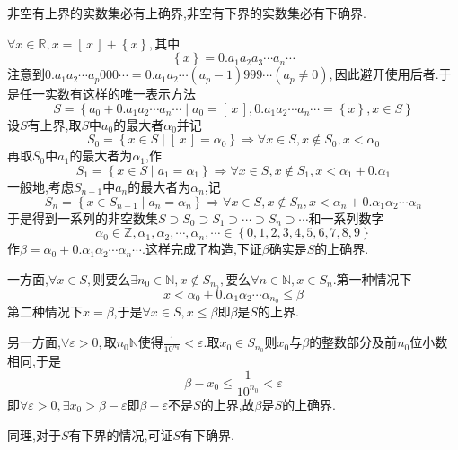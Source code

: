 \begin{formal}
    \begin{theorem}\label{thm:确界存在定理/实数系连续性定理}
        非空有上界的实数集必有上确界,非空有下界的实数集必有下确界.
    \end{theorem}
    \begin{Proof}
        $\forall x\in\mathbb{R},x=\left[\,x\,\right]+\left\{x\right\},$其中\[
        \left\{x\right\}=0.a_1a_2a_3\cdots a_n\cdots
        \]注意到$0.a_1a_2\cdots a_p000\cdots=0.a_1a_2\cdots \left(a_p-1\right)999\cdots\left(a_p\neq 0\right),$因此避开使用后者.于是任一实数有这样的唯一表示方法\[
        S=\left\{
            a_0+0.a_1a_2\cdots a_n\cdots\mid a_0=\left[\,x\,\right],0.a_1a_2\cdots a_n\cdots=\left\{x\right\},x\in S
        \right\}
        \]设$S$有上界,取$S$中$a_0$的最大者$\alpha_0$并记\[
        S_0=\left\{
            x\in S\mid \left[\,x\,\right]=\alpha_0
        \right\}\Longrightarrow\forall x\in S,x\notin S_0,x<\alpha_0
        \]再取$S_0$中$a_1$的最大者为$\alpha_1$,作\[
        S_1=\left\{
            x\in S\mid a_1=\alpha_1
        \right\}\Longrightarrow\forall x\in S,x\notin S_1,x<\alpha_1+0.\alpha_1
        \]一般地,考虑$S_{n-1}$中$a_n$的最大者为$\alpha_n$,记\[
        S_n=\left\{
            x\in S_{n-1}\mid a_n=\alpha_n
        \right\}\Longrightarrow\forall x\in S,x\notin S_n,x<\alpha_n+0.\alpha_1\alpha_2\cdots\alpha_n
        \]于是得到一系列的非空数集$
        S\supset S_0\supset S_1\supset\cdots\supset S_n\supset\cdots
        $和一系列数字\[
        \alpha_0\in\mathbb{Z},\alpha_1,\alpha_2,\cdots,\alpha_n,\cdots\in\left\{
            0,1,2,3,4,5,6,7,8,9
        \right\}
        \]作$\beta=\alpha_0+0.\alpha_1\alpha_2\cdots\alpha_n\cdots$.这样完成了构造,下证$\beta$确实是$S$的上确界.

        一方面,$\forall x\in S,$则要么$\exists n_0\in\mathbb{N},x\notin S_{n_0},$要么$\forall n\in\mathbb{N},x\in S_n.$第一种情况下\[
        x<\alpha_0+0.\alpha_1\alpha_2\cdots\alpha_{n_0}\leqslant \beta
        \]第二种情况下$x=\beta$,于是$\forall x\in S,x\leqslant \beta$即$\beta$是$S$的上界.

        另一方面,$\forall \varepsilon >0,$取$n_0\mathbb{N}$使得$\displaystyle \frac{
            1
        }{10^{n_0}}<\varepsilon.$取$x_0\in S_{n_0}$则$x_0$与$\beta$的整数部分及前$n_0$位小数相同,于是\[
        \beta-x_0\leqslant\frac{1}{10^{n_0}}<\varepsilon
        \]即$\forall \varepsilon>0,\exists x_0>\beta-\varepsilon$即$\beta-\varepsilon$不是$S$的上界,故$\beta$是$S$的上确界.

        同理,对于$S$有下界的情况,可证$S$有下确界.
    \end{Proof}
\end{formal}
